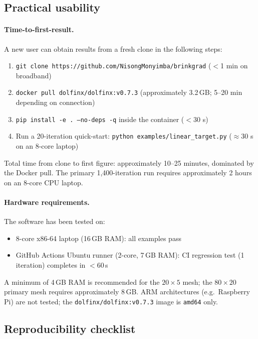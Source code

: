 \subsection{Practical usability}
\label{sec:usability}

\paragraph{Time-to-first-result.}
A new user can obtain results from a fresh clone in the following steps:
\begin{enumerate}
    \item \texttt{git clone https://github.com/NisongMonyimba/brinkgrad}
          ($<$1 min on broadband)
    \item \texttt{docker pull dolfinx/dolfinx:v0.7.3}
          (approximately 3.2\,GB; 5--20 min depending on connection)
    \item \texttt{pip install -e . --no-deps -q} inside the container
          ($<$30 s)
    \item Run a 20-iteration quick-start:
          \texttt{python examples/linear\_target.py} ($\approx$30 s
          on an 8-core laptop)
\end{enumerate}
Total time from clone to first figure: approximately 10--25 minutes,
dominated by the Docker pull.
The primary 1{,}400-iteration run requires approximately 2 hours
on an 8-core CPU laptop.

\paragraph{Hardware requirements.}
The software has been tested on:
\begin{itemize}
    \item 8-core x86-64 laptop (16\,GB RAM): all examples pass
    \item GitHub Actions Ubuntu runner (2-core, 7\,GB RAM):
          CI regression test (1 iteration) completes in $<$60\,s
\end{itemize}
A minimum of 4\,GB RAM is recommended for the $20\times5$ mesh;
the $80\times20$ primary mesh requires approximately 8\,GB.
ARM architectures (e.g.\ Raspberry Pi) are not tested;
the \texttt{dolfinx/dolfinx:v0.7.3} image is \texttt{amd64} only.


\subsection{Reproducibility checklist}
\label{sec:repro_checklist}

